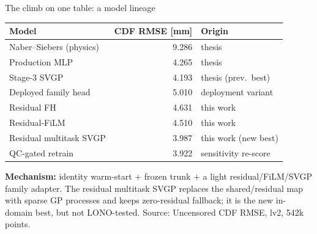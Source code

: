 \documentclass[aspectratio=169,11pt]{beamer}
\newcommand{\good}[1]{\textcolor{goodGreen}{#1}}
\newcommand{\warn}[1]{\textcolor{warnRed}{#1}}
\newcommand{\src}[1]{\vfill{\tiny\textcolor{gray!70!black}{Source: #1}}}
\begin{document}
\begin{frame}{The climb on one table: a model lineage}
\footnotesize
\begin{center}
\renewcommand{\arraystretch}{1.05}
\setlength{\tabcolsep}{6pt}
\begin{tabular}{@{}lrl@{}}
\toprule
\textbf{Model} & \textbf{CDF RMSE [mm]} & \textbf{Origin} \\
\midrule
Naber--Siebers (physics)            & 9.286 & thesis \\
Production MLP                      & 4.265 & thesis \\
Stage-3 SVGP                        & 4.193 & thesis (prev.\ best) \\
\midrule
Deployed family head                & 5.010 & deployment variant \\
Residual FH                         & 4.631 & this work \\
Residual-FiLM                       & 4.510 & this work \\
Residual multitask SVGP             & \good{3.987} & this work (new best) \\
QC-gated retrain                    & \good{3.922} & sensitivity re-score \\
\bottomrule
\end{tabular}
\end{center}
\vspace{0.3em}
\textbf{Mechanism:} identity warm-start + frozen trunk + a light
residual/FiLM/SVGP family adapter. The residual multitask SVGP replaces the
shared/residual map with sparse GP processes and keeps zero-residual fallback;
it is the new in-domain best, but \warn{not LONO-tested}.
\src{Uncensored CDF RMSE, lv2, 542k points.}
\end{frame}
\end{document}
